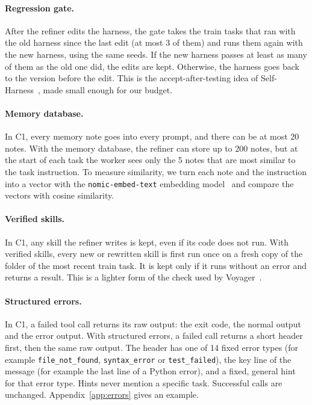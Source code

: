 \paragraph{Regression gate.}
After the refiner edits the harness, the gate takes the train tasks that ran with the old harness
since the last edit (at most 3 of them) and runs them again with the new harness, using the same
seeds. If the new harness passes at least as many of them as the old one did, the edits are kept.
Otherwise, the harness goes back to the version before the edit. This is the accept-after-testing
idea of Self-Harness~\cite{zhang2026selfharness}, made small enough for our budget.

\paragraph{Memory database.}
In C1, every memory note goes into every prompt, and there can be at most 20 notes. With the memory
database, the refiner can store up to 200 notes, but at the start of each task the worker sees only
the 5 notes that are most similar to the task instruction. To measure similarity, we turn each
note and the instruction into a vector with the \texttt{nomic-embed-text} embedding
model~\cite{nussbaum2024nomic} and compare the vectors with cosine similarity.

\paragraph{Verified skills.}
In C1, any skill the refiner writes is kept, even if its code does not run. With verified skills,
every new or rewritten skill is first run once on a fresh copy of the folder of the most recent
train task. It is kept only if it runs without an error and returns a result. This is a lighter
form of the check used by Voyager~\cite{wang2023voyager}.

\paragraph{Structured errors.}
In C1, a failed tool call returns its raw output: the exit code, the normal output and the error
output. With structured errors, a failed call returns a short header first, then the same raw
output. The header has one of 14 fixed error types (for example \texttt{file\_not\_found},
\texttt{syntax\_error} or \texttt{test\_failed}), the key line of the message (for example the last
line of a Python error), and a fixed, general hint for that error type. Hints never mention a
specific task. Successful calls are unchanged. Appendix~\ref{app:errors} gives an example.

